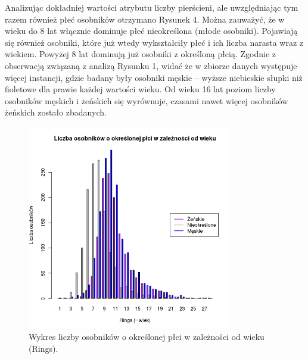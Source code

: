 \documentclass{scrartcl}
\begin{document}
  \pagebreak
  Analizując dokładniej wartości atrybutu liczby pierścieni, ale uwzględniając
  tym razem również płeć osobników otrzymano Rysunek 4. Można zauważyć, że w
  wieku do 8 lat włącznie dominuje płeć nieokreślona (młode osobniki). Pojawiają
  się również osobniki, które już wtedy wykształciły płeć i ich liczba narasta wraz
  z wiekiem. Powyżej 8 lat dominują już osobniki z określoną płcią. Zgodnie z
  obserwacją związaną z analizą Rysunku 1, widać że w zbiorze danych występuje więcej
  instancji, gdzie badany były osobniki męskie -- wyższe niebieskie słupki niż fioletowe
  dla prawie każdej wartości wieku. Od wieku 16 lat poziom liczby osobników męskich 
  i żeńskich się wyrównuje, czasami nawet więcej osobników żeńskich zostało zbadanych.

  \begin{figure}[H]
    \center
    \includegraphics[width=0.8\textwidth]{plots/barplot_age_sex.png}
    \caption{Wykres liczby osobników o określonej płci w zależności od wieku (Rings).}
  \end{figure}
\end{document}
